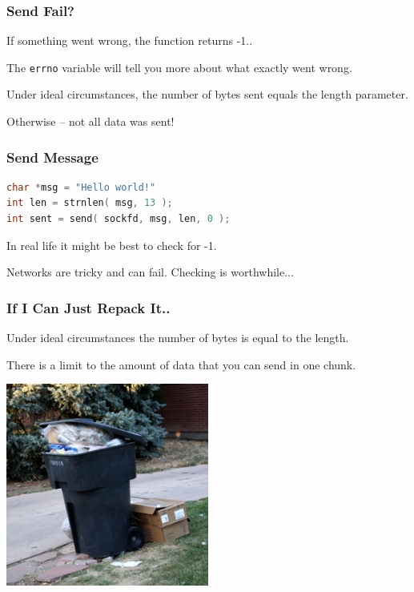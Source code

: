 \begin{frame}
\frametitle{Send Fail?}

If something went wrong, the function returns -1..

The \texttt{errno} variable will tell you more about what exactly went wrong. 

Under ideal circumstances, the number of bytes sent equals the length parameter.

Otherwise -- not all data was sent!

\end{frame}



\begin{frame}[fragile]
\frametitle{Send Message}

\begin{lstlisting}[language=C]
char *msg = "Hello world!"
int len = strnlen( msg, 13 );
int sent = send( sockfd, msg, len, 0 );
\end{lstlisting}

In real life it might be best to check for -1. 

Networks are tricky and can fail. Checking is worthwhile...

\end{frame}



\begin{frame}
\frametitle{If I Can Just Repack It..}

Under ideal circumstances the number of bytes is equal to the length.

There is a limit to the amount of data that you can send in one chunk. 
 
\begin{center}
	\includegraphics[width=0.5\textwidth]{images/overflowing-garbage.jpg}
\end{center}

\end{frame}



